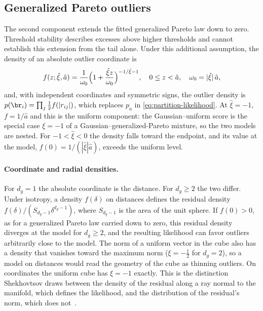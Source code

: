 \documentclass[10pt,twocolumn,letterpaper]{article}
\newcommand{\gaussunif}{Gaussian--uniform\xspace}
\newcommand{\ahat}{\hat a}
\begin{document}
\subsection{Generalized Pareto outliers}
\label{sec:gpd-component}

The second component extends the fitted generalized Pareto law down
to zero. Threshold stability describes excesses above higher thresholds
and cannot establish this extension from the tail alone. Under this
additional assumption, the density of an absolute outlier coordinate is
\begin{equation}
 f(z;\hat\xi,\ahat)=\frac{1}{\omega_0}
 \Bigl(1+\frac{\hat\xi z}{\omega_0}\Bigr)^{-1/\hat\xi-1},
 \quad 0\leq z<\ahat,\quad \omega_0=|\hat\xi|\,\ahat,
 \label{eq:gpd-density}
\end{equation}
and, with independent coordinates and symmetric signs, the outlier
density is $p(\br_i)=\prod_j\tfrac12 f(|r_{ij}|)$, which replaces $p_a$ in
\cref{eq:partition-likelihood}. At $\hat\xi=-1$, $f=1/\ahat$ and this
is the uniform component: the \gaussunif score is the special case
$\xi=-1$ of a Gaussian--generalized-Pareto mixture, so the two models are
nested. For $-1<\hat\xi<0$ the density falls toward the endpoint, and its
value at the model, $f(0)=1/(|\hat\xi|\ahat)$, exceeds the uniform
level.

\paragraph{Coordinate and radial densities.}

For $d_g=1$ the absolute coordinate is the distance. For $d_g\geq2$ the
two differ. Under isotropy, a density $f(\delta)$ on distances defines the residual
density $f(\delta)/(S_{d_g-1}\delta^{d_g-1})$, where $S_{d_g-1}$ is the
area of the unit sphere. If $f(0)>0$, as for a generalized Pareto law
carried down to zero, this residual density diverges at the model for
$d_g\geq2$, and the resulting likelihood can favor outliers arbitrarily close to the model. The norm
of a uniform vector in the cube also has a density that vanishes toward the
maximum norm ($\xi=-\tfrac12$ for $d_g=2$), so a model on distances would
read the geometry of the cube as thinning outliers. On coordinates the
uniform cube has $\xi=-1$ exactly. This is the distinction Shekhovtsov
draws between the density of the residual along a ray normal to the
manifold, which defines the likelihood, and the distribution of the
residual's norm, which does not~\cite[Sec.~5.1]{Shekhovtsov2025}.
\end{document}
